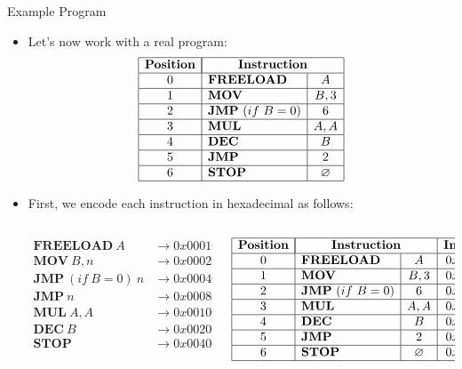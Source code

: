 \begin{frame}[allowframebreaks]{Example Program}
\begin{itemize}
\item Let's now work with a real program:
\[
\begin{array}{|c|l|c|}
\hline
\mathbf{Position} & \multicolumn{2}{|c|}{\mathbf{Instruction}} \\ \hline
0 & \mathbf{FREELOAD} & A \\ \hline
1 & \mathbf{MOV} & B, 3 \\ \hline
2 & \mathbf{JMP}~(if~B = 0) & 6 \\ \hline
3 & \mathbf{MUL} & A, A \\ \hline
4 & \mathbf{DEC} & B \\ \hline
5 & \mathbf{JMP} & 2 \\ \hline
6 & \mathbf{STOP} & \emptyset \\ \hline
\end{array}
\]

\item First, we encode each instruction in hexadecimal as follows:
\begin{columns}
\begin{column}{0.5\textwidth}
\begin{align*}
\mathbf{FREELOAD}~A &\to 0x00010000 \\
\mathbf{MOV}~B,n &\to 0x00020000 + n \\
\mathbf{JMP}~(if~B = 0)~n &\to 0x00040000 + n \\
\mathbf{JMP}~n &\to 0x00080000 + n \\
\mathbf{MUL}~A,A &\to 0x00100000 \\
\mathbf{DEC}~B &\to 0x00200000 \\
\mathbf{STOP} &\to 0x00400000 
\end{align*}
\end{column}
\begin{column}{0.5\textwidth}
\[
\begin{array}{|c|l|c|c|}
\hline
\mathbf{Position} & \multicolumn{2}{|c|}{\mathbf{Instruction}} & \mathbf{Inst.~Value}\\ \hline
0 & \mathbf{FREELOAD} & A & 0x00010000 \\ \hline
1 & \mathbf{MOV} & B, 3 & 0x00020003 \\ \hline
2 & \mathbf{JMP}~(if~B = 0) & 6 & 0x00040006 \\ \hline
3 & \mathbf{MUL} & A, A & 0x00100000 \\ \hline
4 & \mathbf{DEC} & B & 0x00200000 \\ \hline
5 & \mathbf{JMP} & 2 & 0x00080002 \\ \hline
6 & \mathbf{STOP} & \emptyset & 0x00400000 \\ \hline
\end{array}
\]
\end{column}
\end{columns}


\end{itemize}
\end{frame}

